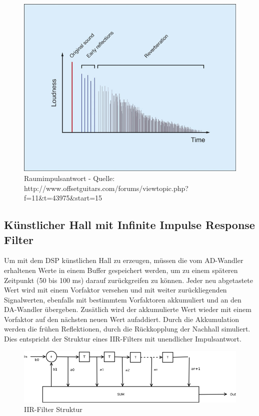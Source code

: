 \documentclass[a4paper,12pt,fontsize=12,DIV=12]{scrartcl}
\begin{document}
\begin{figure}[h]
	\includegraphics[scale=0.5]{Bilder/raumimpulsantwort.jpg}
	\caption{Raumimpulsantwort - Quelle: http://www.offsetguitars.com/forums/viewtopic.php?f=11\&t=43975\&start=15}
	\label{labelname}
\end{figure}

\subsection{Künstlicher Hall mit Infinite Impulse Response Filter}
Um mit dem DSP künstlichen Hall zu erzeugen, müssen die vom AD-Wandler erhaltenen Werte in einem Buffer gespeichert werden, um zu einem späteren Zeitpunkt (50 bis 100 ms) darauf zurückgreifen zu können. Jeder neu abgetastete Wert wird mit einem Vorfaktor versehen und mit weiter zurückliegenden Signalwerten, ebenfalls mit bestimmtem Vorfaktoren akkumuliert und an den DA-Wandler übergeben. Zusätlich wird der akkumulierte Wert wieder mit einem Vorfaktor auf den nächsten neuen Wert aufaddiert. Durch die Akkumulation werden die frühen Reflektionen, durch die Rückkopplung der Nachhall simuliert. 
Dies entspricht der Struktur eines IIR-Filters mit unendlicher Impulsantwort.
\begin{figure}[h]
	\includegraphics[scale=0.5]{Bilder/iir.png}
	\caption{IIR-Filter Struktur}
	\label{labelnameIIR-Filter Struktur}
\end{figure}
\end{document}
